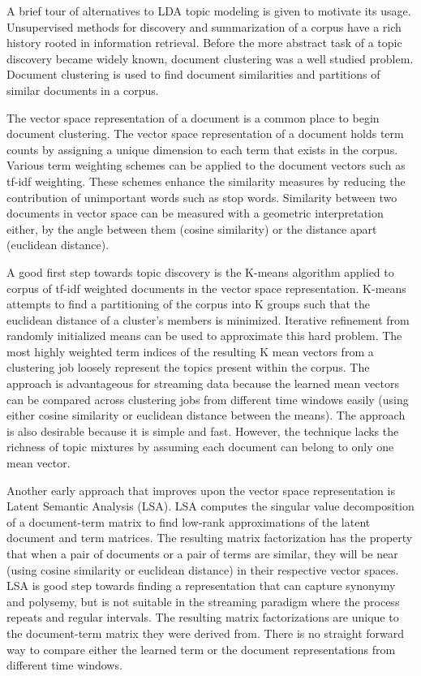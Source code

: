 \documentclass[10pt]{article}
\begin{document}
A brief tour of alternatives to LDA topic modeling is given to motivate its usage.  Unsupervised methods for discovery and summarization of a corpus have a rich history rooted in information retrieval.  Before the more abstract task of a topic discovery became widely known, document clustering was a well studied problem.  Document clustering is used to find document similarities and partitions of similar documents in a corpus.   

The vector space representation of a document is a common place to begin document clustering.  The vector space representation of a document holds term counts by assigning a unique dimension to each term that exists in the corpus.  Various term weighting schemes can be applied to the document vectors such as tf-idf weighting.  These schemes enhance the similarity measures by reducing the contribution of unimportant words such as stop words.  Similarity between two documents in vector space can be measured with a geometric interpretation either, by the angle between them (cosine similarity) or the distance apart (euclidean distance).

A good first step towards topic discovery is the K-means algorithm applied to corpus of tf-idf weighted documents in the vector space representation.  K-means attempts to find a partitioning of the corpus into K groups such that the euclidean distance of a cluster's members is minimized.  Iterative refinement from randomly initialized means can be used to approximate this hard problem.  The most highly weighted term indices of the resulting K mean vectors from a clustering job loosely represent the topics present within the corpus.  The approach is advantageous for streaming data because the learned mean vectors can be compared across clustering jobs from different time windows easily (using either cosine similarity or euclidean distance between the means).  The approach is also desirable because it is simple and fast.  However, the technique lacks the richness of topic mixtures by assuming each document can belong to only one mean vector. 

Another early approach that improves upon the vector space representation is Latent Semantic Analysis (LSA).  LSA computes the singular value decomposition of a document-term matrix to find low-rank approximations of the latent document and term matrices.  The resulting matrix factorization has the property that when a pair of documents or a pair of terms are similar, they will be near (using cosine similarity or euclidean distance) in their respective vector spaces.  LSA is good step towards finding a representation that can capture synonymy and polysemy, but is not suitable in the streaming paradigm where the process repeats and regular intervals.  The resulting matrix factorizations are unique to the document-term matrix they were derived from.  There is no straight forward way to compare either the learned term or the document representations from different time windows.
\end{document}
